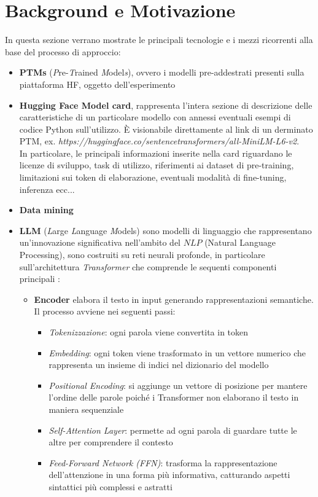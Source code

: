 \documentclass{article}
\begin{document}
\section{Background e Motivazione}
In questa sezione verrano mostrate le principali tecnologie e i mezzi ricorrenti alla base del processo di approccio:
\begin{itemize}
    \item \textbf{PTMs} (\textit{P}re-\textit{T}rained \textit{M}odel\textit{s}), ovvero i modelli pre-addestrati presenti sulla piattaforma HF, oggetto dell'esperimento
    \item \textbf{Hugging Face Model card}, rappresenta l'intera sezione di descrizione delle caratteristiche di un particolare modello con annessi eventuali esempi di codice Python sull'utilizzo. È visionabile direttamente al link di un derminato PTM, ex. \textit{https://huggingface.co/sentencetransformers/all-MiniLM-L6-v2}.\\
    In particolare, le principali informazioni inserite nella card riguardano le licenze di sviluppo, task di utilizzo, riferimenti ai dataset di pre-training, limitazioni sui token di elaborazione, eventuali modalità di fine-tuning, inferenza ecc...
    \item \textbf{Data mining} 
    \item \textbf{LLM} (\textit{L}arge \textit{L}anguage \textit{M}odels) sono modelli di linguaggio che rappresentano un'innovazione significativa nell'ambito del \(NLP\) (Natural Language Processing), sono costruiti su reti neurali profonde, in particolare sull'architettura \textit{Transformer} che comprende le sequenti componenti principali \cite{di2025use}:
\begin{itemize}
    \item \textbf{Encoder} elabora il testo in input generando rappresentazioni semantiche. Il processo avviene nei seguenti passi:
    \begin{itemize}
        \item \textit{Tokenizzazione}: ogni parola viene convertita in token
        \item \textit{Embedding}: ogni token viene trasformato in un vettore numerico che rappresenta un insieme di indici nel dizionario del modello
        \item \textit{Positional Encoding}: si aggiunge un vettore di posizione per mantere l'ordine delle parole poiché i Transformer non elaborano il testo in maniera sequenziale
        \item \textit{Self-Attention Layer}: permette ad ogni parola di guardare tutte le altre per comprendere il contesto
        \item \textit{Feed-Forward Network (FFN)}: trasforma la rappresentazione dell'attenzione in una forma più informativa, catturando aspetti sintattici più complessi e astratti
        

\end{itemize}
\end{itemize}
\end{itemize}
\end{document}
